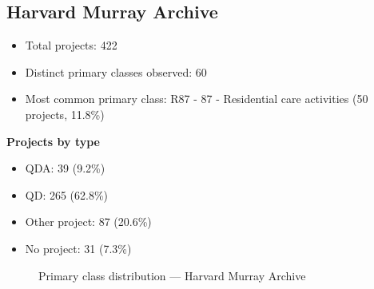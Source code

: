 \subsection{Harvard Murray Archive}

\begin{itemize}
    \item Total projects: 422
    \item Distinct primary classes observed: 60
    \item Most common primary class: R87 - 87 - Residential care activities (50 projects, 11.8\%)
\end{itemize}
\textbf{Projects by type}
\begin{itemize}
    \item QDA: 39 (9.2\%)
    \item QD: 265 (62.8\%)
    \item Other project: 87 (20.6\%)
    \item No project: 31 (7.3\%)
\end{itemize}

\begin{figure}[H]
    \centering
    
    \caption{Primary class distribution --- Harvard Murray Archive}
\end{figure}

